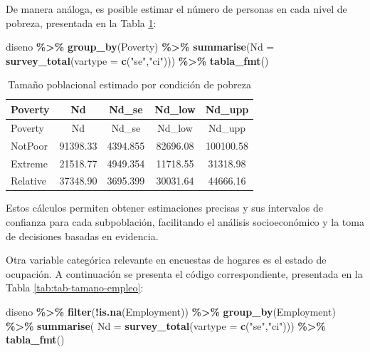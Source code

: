\documentclass[
  spanish,
  12pt,
]{book}
\newenvironment{Shaded}{\begin{snugshade}}{\end{snugshade}}
\newcommand{\AttributeTok}[1]{\textcolor[rgb]{0.13,0.29,0.53}{#1}}
\newcommand{\FunctionTok}[1]{\textcolor[rgb]{0.13,0.29,0.53}{\textbf{#1}}}
\newcommand{\NormalTok}[1]{#1}
\newcommand{\SpecialCharTok}[1]{\textcolor[rgb]{0.81,0.36,0.00}{\textbf{#1}}}
\newcommand{\StringTok}[1]{\textcolor[rgb]{0.31,0.60,0.02}{#1}}
\begin{document}
De manera análoga, es posible estimar el número de personas en cada nivel de pobreza, presentada en la Tabla \ref{tab:tab-tamano-pobreza}:

\begin{Shaded}
\begin{Highlighting}[]
\NormalTok{diseno }\SpecialCharTok{\%\textgreater{}\%} 
  \FunctionTok{group\_by}\NormalTok{(Poverty) }\SpecialCharTok{\%\textgreater{}\%} 
  \FunctionTok{summarise}\NormalTok{(}\AttributeTok{Nd =} \FunctionTok{survey\_total}\NormalTok{(}\AttributeTok{vartype =} \FunctionTok{c}\NormalTok{(}\StringTok{"se"}\NormalTok{,}\StringTok{"ci"}\NormalTok{))) }\SpecialCharTok{\%\textgreater{}\%}
  \FunctionTok{tabla\_fmt}\NormalTok{()}
\end{Highlighting}
\end{Shaded}

\begin{longtable}[]{@{}lcccc@{}}
\caption{\label{tab:tab-tamano-pobreza}Tamaño poblacional estimado por condición de pobreza}\tabularnewline
\toprule\noalign{}
Poverty & Nd & Nd\_se & Nd\_low & Nd\_upp \\
\midrule\noalign{}
\endfirsthead
\toprule\noalign{}
Poverty & Nd & Nd\_se & Nd\_low & Nd\_upp \\
\midrule\noalign{}
\endhead
\bottomrule\noalign{}
\endlastfoot
NotPoor & 91398.33 & 4394.855 & 82696.08 & 100100.58 \\
Extreme & 21518.77 & 4949.354 & 11718.55 & 31318.98 \\
Relative & 37348.90 & 3695.399 & 30031.64 & 44666.16 \\
\end{longtable}

Estos cálculos permiten obtener estimaciones precisas y sus intervalos de confianza para cada subpoblación, facilitando el análisis socioeconómico y la toma de decisiones basadas en evidencia.

Otra variable categórica relevante en encuestas de hogares es el estado de ocupación. A continuación se presenta el código correspondiente, presentada en la Tabla \ref{tab:tab-tamano-empleo}:

\begin{Shaded}
\begin{Highlighting}[]
\NormalTok{diseno }\SpecialCharTok{\%\textgreater{}\%} 
  \FunctionTok{filter}\NormalTok{(}\SpecialCharTok{!}\FunctionTok{is.na}\NormalTok{(Employment)) }\SpecialCharTok{\%\textgreater{}\%}
  \FunctionTok{group\_by}\NormalTok{(Employment) }\SpecialCharTok{\%\textgreater{}\%} 
  \FunctionTok{summarise}\NormalTok{( }\AttributeTok{Nd =} \FunctionTok{survey\_total}\NormalTok{(}\AttributeTok{vartype =} \FunctionTok{c}\NormalTok{(}\StringTok{"se"}\NormalTok{,}\StringTok{"ci"}\NormalTok{))) }\SpecialCharTok{\%\textgreater{}\%}
  \FunctionTok{tabla\_fmt}\NormalTok{()}
\end{Highlighting}
\end{Shaded}
\end{document}

